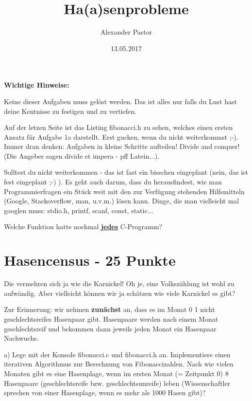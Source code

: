 \documentclass{article}
\begin{document}
\title{Ha(a)senprobleme}
\author{Alexander Pastor}
\date{13.05.2017}
\maketitle
\tableofcontents

\bigskip

\textbf{Wichtige Hinweise:}

\bigskip

Keine dieser Aufgaben muss gelöst werden. Das ist alles nur falls du Lust hast deine Kentnisse zu festigen und zu vertiefen.

\bigskip

Auf der letzen Seite ist das Listing fibonacci.h zu sehen, welches einen ersten Ansatz für Aufgabe 1a darstellt. Erst gucken, wenn du nicht weiterkommst ;-). Immer dran denken: Aufgaben in kleine Schritte aufteilen! Divide and conquer! (Die Angeber sagen divide et impera - pff Latein...).

\bigskip

Solltest du nicht weiterkommen - das ist fast ein bisschen eingeplant (nein, das ist fest eingeplant ;-) ). Es geht auch darum, dass du herausfindest, wie man Programmierfragen ein Stück weit mit den zur Verfügung stehenden Hilfsmitteln (Google, Stackoverflow, man, u.v.m.) lösen kann. Dinge, die man vielleicht mal googlen muss: stdio.h, printf, scanf, const, static...

\bigskip

Welche Funktion hatte nochmal \underline{\textbf{jedes}} C-Programm? 

\newpage

\section{Hasencensus - 25 Punkte}

Die vermehren sich ja wie die Karnickel! Oh je, eine Volkszählung ist wohl zu aufwändig. Aber vielleicht können wir ja schätzen wie viele Karnickel es gibt?

\bigskip
Zur Erinnerung: wir nehmen \textbf{zunächst} an, dass es im Monat 0 1 nicht geschlechtsreifes Hasenpaar gibt. Hasenpaare werden nach einem Monat geschlechtsreif und bekommen dann jeweils jeden Monat ein Hasenpaar Nachwuchs. 

\bigskip

a) Lege mit der Konsole fibonacci.c und fibonacci.h an. Implementiere einen iterativen Algorithmus zur Berechnung von Fibonaccizahlen. Nach wie vielen Monaten gibt es eine Hasenplage, wenn im ersten Monat (= Zeitpunkt 0)  8 Hasenpaare (geschlechtsreife bzw. geschlechtsunreife) leben (Wissenschaftler sprechen von einer Hasenplage, wenn es mehr als 1000 Hasen gibt)?
\end{document}
